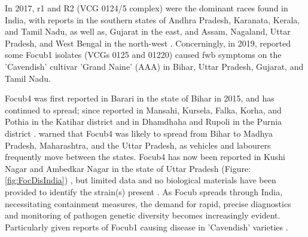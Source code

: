 In 2017, \ac{r1} and R2 (VCG 0124/5 complex) were the dominant races found in India, with reports in  the southern states of Andhra Pradesh, Karanata, Kerala, and Tamil Nadu, as well as, Gujarat in the east, and Assam, Nagaland, Uttar Pradesh, and West Bengal in the north-west \parencite{Mostert2017, Thangavelu2020}. Concerningly, in 2019, \textcite{Thangavelu2020} reported some \ac{Focub1} isolates (VCGs 0125 and 01220) caused \ac{fwb} symptoms on the 'Cavendish' cultivar 'Grand Naine' (AAA) in Bihar, Uttar Pradesh, Gujarat, and Tamil Nadu.  

\Ac{Focub4} was first reported in Barari in the state of Bihar in 2015, and has continued to spread; since  reported in Mansahi, Kursela, Falka, Korha, and Pothia in the Katihar district and in Dhamdhaha and Rupoli in the Purnia district \parencite{Thangavelu2019}. \textcite{Viljoen2020} warned that \ac{Focub4} was likely to spread from Bihar to Madhya Pradesh, Maharashtra, and the Uttar Pradesh, as vehicles and labourers frequently move between the states. \ac{Focub4} has now been reported in Kushi Nagar and Ambedkar Nagar in the state of Uttar Pradesh (Figure: \ref{fig:FocDisIndia}) \parencite{Damodaran2019, Thangavelu2019}, but limited data and no biological materials have been provided to identify the strain(s) present \parencite{Kema2021}. As \ac{Focub} spreads through India, necessitating containment measures, the demand for rapid, precise diagnostics and monitoring of pathogen genetic diversity becomes increasingly evident. Particularly given reports of \ac{Focub1} causing disease in 'Cavendish' varieties \parencite{Thangavelu2020}.

